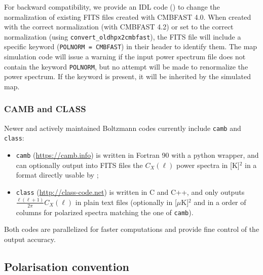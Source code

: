 \documentclass[12pt,twoside]{article}
\begin{document}
For backward compatibility, we provide an IDL code 
() 
to change the normalization of existing FITS files created with CMBFAST 4.0. 
When created with the correct normalization (with CMBFAST 4.2)
or set to the correct normalization (using \texttt{convert\_oldhpx2cmbfast}), the FITS file will include a
specific keyword (\texttt{POLNORM = CMBFAST}) in their header to identify them.
The map simulation code 
will issue a warning if the input power
spectrum file does not contain the keyword \texttt{POLNORM}, but no attempt will
be made to renormalize the power spectrum. If the keyword is present, it will be
inherited by the simulated map.


\subsubsection{CAMB and CLASS}
Newer and actively maintained Boltzmann codes currently include 
\texttt{camb} and \texttt{class}:
\begin{itemize}
\item \texttt{camb} (\url{https://camb.info}) 
is written in Fortran 90 with a python wrapper, and can optionally output into FITS files 
the $C_X(\ell)$ power spectra in [K]$^2$ in a format directly usable by \healpixns;\\
\item \texttt{class} (\url{http://class-code.net}) 
is written in C and C++, and only outputs $\frac{\ell(\ell+1)}{2\pi}C_X(\ell)$ in plain text files 
(optionally in [$\mu$K]$^2$ and in a order of columns for polarized spectra matching the one of \texttt{camb}).
\end{itemize}
Both codes are parallelized for faster computations and provide fine control of the output accuracy.

\subsection{Polarisation convention}
\label{subsec:pol}
\newcommand{\Cl}[1]{C_{\ell}^{\mathrm{#1}}}
\newcommand{\Chl}[1]{C_{\ell}^{\mathrm{#1}}}
\newcommand{\Czl}[1]{C_{\mathrm{#1},\ell}}
\newcommand{\alm}[1]{a_{\ell m}^{\mathrm{#1}}}
\newcommand{\azlm}[1]{a_{\mathrm{#1},\ell m}}
\newcommand{\pushup}{\rule[.3cm]{0cm}{.2cm}}
\newcommand{\pushdn}{\rule[-.3cm]{0cm}{.2cm}}
\newcommand{\push}{\pushup\pushdn}
\newcommand{\vecn}{\textbf{n}}
\newcommand{\veceo}{\textbf{e}_{1}}
\newcommand{\vecet}{\textbf{e}_{2}}
\newcommand{\vectheta}{\textbf{e}_\theta}
\newcommand{\vecphi}{\textbf{e}_\phi}
\newcommand{\mattwo}[2]
{{
\left( 
\begin{array}{c} #1 \push \\#2 \push \end{array}
\right) 
}}
\end{document}
